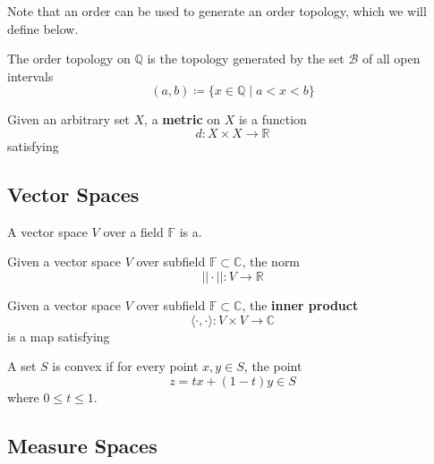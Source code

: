   Note that an order can be used to generate an order topology, which we will define below. 

  \begin{example}
    The order topology on $\mathbb{Q}$ is the topology generated by the set $\mathscr{B}$ of all open intervals 
    \begin{equation}
      (a, b) \coloneqq \{ x \in \mathbb{Q} \mid a < x < b\}
    \end{equation}
  \end{example}

  \begin{definition}[Metric]
    Given an arbitrary set $X$, a \textbf{metric} on $X$ is a function 
    \begin{equation}
      d: X \times X \rightarrow \mathbb{R}
    \end{equation}
    satisfying
  \end{definition}

\subsection{Vector Spaces}

  \begin{definition}
    A vector space $V$ over a field $\mathbb{F}$ is a. 
  \end{definition}

  \begin{example}[Norm]
    Given a vector space $V$ over subfield $\mathbb{F} \subset \mathbb{C}$, the norm 
    \begin{equation}
      ||\cdot|| : V \rightarrow \mathbb{R}
    \end{equation}
  \end{example}

  \begin{example}
    Given a vector space $V$ over subfield $\mathbb{F} \subset \mathbb{C}$, the \textbf{inner product} 
    \begin{equation}
      \langle \cdot, \cdot \rangle : V \times V \rightarrow \mathbb{C}
    \end{equation} 
    is a map satisfying 
  \end{example}

  \begin{definition}
    A set $S$ is convex if for every point $x, y \in S$, the point 
    \begin{equation}
      z = t x + (1 - t) y \in S
    \end{equation}
    where $0 \leq t \leq 1$. 
  \end{definition}

\subsection{Measure Spaces}


